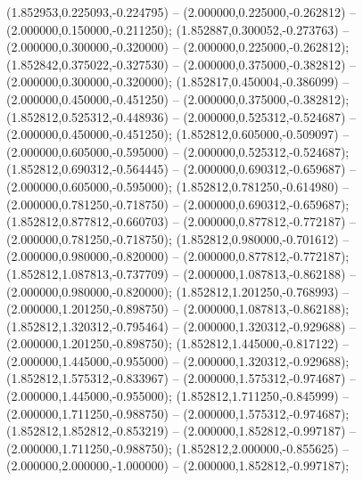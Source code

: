  (1.852953,0.225093,-0.224795) -- (2.000000,0.225000,-0.262812) -- (2.000000,0.150000,-0.211250);
 (1.852887,0.300052,-0.273763) -- (2.000000,0.300000,-0.320000) -- (2.000000,0.225000,-0.262812);
 (1.852842,0.375022,-0.327530) -- (2.000000,0.375000,-0.382812) -- (2.000000,0.300000,-0.320000);
 (1.852817,0.450004,-0.386099) -- (2.000000,0.450000,-0.451250) -- (2.000000,0.375000,-0.382812);
 (1.852812,0.525312,-0.448936) -- (2.000000,0.525312,-0.524687) -- (2.000000,0.450000,-0.451250);
 (1.852812,0.605000,-0.509097) -- (2.000000,0.605000,-0.595000) -- (2.000000,0.525312,-0.524687);
 (1.852812,0.690312,-0.564445) -- (2.000000,0.690312,-0.659687) -- (2.000000,0.605000,-0.595000);
 (1.852812,0.781250,-0.614980) -- (2.000000,0.781250,-0.718750) -- (2.000000,0.690312,-0.659687);
 (1.852812,0.877812,-0.660703) -- (2.000000,0.877812,-0.772187) -- (2.000000,0.781250,-0.718750);
 (1.852812,0.980000,-0.701612) -- (2.000000,0.980000,-0.820000) -- (2.000000,0.877812,-0.772187);
 (1.852812,1.087813,-0.737709) -- (2.000000,1.087813,-0.862188) -- (2.000000,0.980000,-0.820000);
 (1.852812,1.201250,-0.768993) -- (2.000000,1.201250,-0.898750) -- (2.000000,1.087813,-0.862188);
 (1.852812,1.320312,-0.795464) -- (2.000000,1.320312,-0.929688) -- (2.000000,1.201250,-0.898750);
 (1.852812,1.445000,-0.817122) -- (2.000000,1.445000,-0.955000) -- (2.000000,1.320312,-0.929688);
 (1.852812,1.575312,-0.833967) -- (2.000000,1.575312,-0.974687) -- (2.000000,1.445000,-0.955000);
 (1.852812,1.711250,-0.845999) -- (2.000000,1.711250,-0.988750) -- (2.000000,1.575312,-0.974687);
 (1.852812,1.852812,-0.853219) -- (2.000000,1.852812,-0.997187) -- (2.000000,1.711250,-0.988750);
 (1.852812,2.000000,-0.855625) -- (2.000000,2.000000,-1.000000) -- (2.000000,1.852812,-0.997187);
